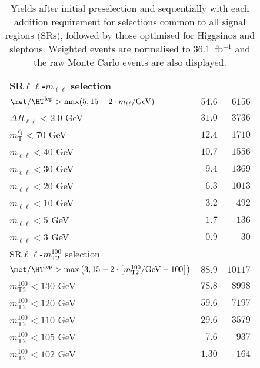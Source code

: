 \begin{table}
\begin{center}
\begin{tabular*}{\textwidth}{@{\extracolsep{\fill}}lrr}
\midrule
SR$\ell\ell$-$m_{\ell\ell}$ selection & \\ 
\midrule
$\met / \HT^\text{lep} > \text{max}(5, 15-2\cdot m_{\ell\ell}/\text{GeV})$ & $54.6$ & $6156$   \\ 
    $\Delta R_{\ell\ell} < 2.0$ GeV & $31.0$ & $3736$   \\ 
    $m_\text{T}^{\ell_1} < 70$ GeV & $12.4$ & $1710$   \\ 
    $m_{\ell\ell} < 40$ GeV & $10.7$ & $1556$   \\ 
    $m_{\ell\ell} < 30$ GeV & $9.4$ & $1369$   \\ 
    $m_{\ell\ell} < 20$ GeV & $6.3$ & $1013$   \\ 
    $m_{\ell\ell} < 10$ GeV & $3.2$ & $492$   \\ 
    $m_{\ell\ell} < 5$ GeV & $1.7$ & $136$   \\ 
    $m_{\ell\ell} < 3$ GeV & $0.9$ & $30$   \\ 
    \midrule
SR$\ell\ell$-$m_\text{T2}^{100}$ selection & \\ 
\midrule
$\met / \HT^\text{lep} > \text{max}\left(3, 15-2\cdot \left[m_\text{T2}^{100}/\text{GeV} - 100\right]\right)$ & $88.9$ & $10117$   \\ 
    $m_\text{T2}^{100} < 130$ GeV & $78.8$ & $8998$   \\ 
    $m_\text{T2}^{100} < 120$ GeV & $59.6$ & $7197$   \\ 
    $m_\text{T2}^{100} < 110$ GeV & $29.6$ & $3579$   \\ 
    $m_\text{T2}^{100} < 105$ GeV & $7.6$ & $937$   \\ 
    $m_\text{T2}^{100} < 102$ GeV & $1.30$ & $164$   \\ 
    
  \bottomrule
  \end{tabular*}
\end{center}
\caption{ Yields after initial preselection and sequentially with each addition requirement 
for selections common to all signal regions (SRs), 
followed by those optimised for Higgsinos and sleptons. 
Weighted events are normalised to 36.1~fb$^{-1}$ and the raw Monte Carlo events are also displayed.
}
\label{tab:cutflow_diboson}
\end{table} 
  